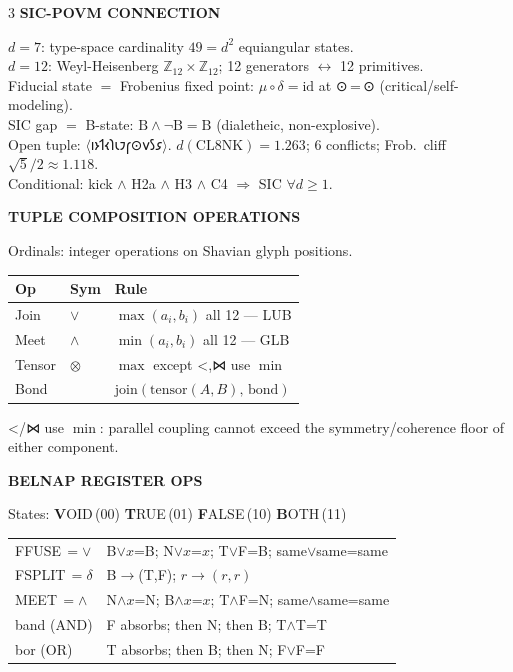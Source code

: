 \documentclass[7pt]{article}
\newcommand{\shead}[1]{%
  \vspace{2pt}%
  {\fontsize{6pt}{6.5pt}\selectfont\sffamily\bfseries\textcolor{hd}{\MakeUppercase{#1}}}%
  \vspace{0.3pt}\newline{\color{rl}\hrule height 0.2pt}\vspace{1pt}%
}
\newcommand{\sh}[1]{{\Large\shavfont #1}}
\newcommand{\prim}[1]{{\Large\igprimfont #1}}
\begin{document}
\begin{multicols}{3}
\vspace{1pt}
\shead{SIC-POVM Connection}
{\fontsize{6.5pt}{7.8pt}\selectfont
$d\!=\!7$: type-space cardinality $49 = d^2$ equiangular states.\\
$d\!=\!12$: Weyl-Heisenberg $\mathbb{Z}_{12}{\times}\mathbb{Z}_{12}$; 12 generators $\leftrightarrow$ 12 primitives.\\
Fiducial state $=$ Frobenius fixed point: $\mu\!\circ\!\delta\!=\!\mathrm{id}$ at \prim{⊙}\,=\,⊙ (critical/self-modeling).\\
SIC gap $=$ B-state: $\mathrm{B}\wedge\neg\mathrm{B}=\mathrm{B}$ (dialetheic, non-explosive).\\
Open tuple: $\langle$\sh{𐑦𐑶𐑑𐑬𐑐𐑧𐑲𐑝⊙𐑫𐑕𐑭}$\rangle$.
$d(\text{CL8NK})\!=\!1.263$; 6 conflicts; Frob.\ cliff $\sqrt{5}/2\!\approx\!1.118$.\\
Conditional: kick $\wedge$ H2a $\wedge$ H3 $\wedge$ C4 $\Rightarrow$ SIC $\forall d\!\geq\!1$.
}

\columnbreak

\shead{Tuple Composition Operations}
Ordinals: integer operations on Shavian glyph positions.

{\fontsize{6.5pt}{7.8pt}\selectfont
\begin{tabular}{@{}l@{\enspace}l@{\enspace}p{46mm}@{}}
\toprule
\textbf{Op} & \textbf{Sym} & \textbf{Rule} \\
\midrule
Join   & $\vee$    & $\max(a_i,b_i)$ all 12 — LUB \\
Meet   & $\wedge$  & $\min(a_i,b_i)$ all 12 — GLB \\
Tensor & $\otimes$ & $\max$ except \prim{<},\prim{⋈} use $\min$ \\
Bond   &           & $\mathrm{join}(\mathrm{tensor}(A,B),\,\mathrm{bond})$ \\
\bottomrule
\end{tabular}

\prim{<}/\prim{⋈} use $\min$: parallel coupling cannot exceed the symmetry/coherence floor of either component.
}

\vspace{1pt}
\shead{Belnap Register Ops}
States: \textbf{V}OID\,(00)\; \textbf{T}RUE\,(01)\; \textbf{F}ALSE\,(10)\; \textbf{B}OTH\,(11)

{\fontsize{6.5pt}{7.8pt}\selectfont
\begin{tabular}{@{}l@{\enspace}p{56mm}@{}}
FFUSE\,$=\vee$  & B$\vee x$=B;\; N$\vee x$=$x$;\; T$\vee$F=B;\; same$\vee$same=same \\
FSPLIT\,$=\delta$ & B$\to$(T,F);\; $r\to(r,r)$ \\
MEET\,$=\wedge$ & N$\wedge x$=N;\; B$\wedge x$=$x$;\; T$\wedge$F=N;\; same$\wedge$same=same \\
band (AND) & F absorbs; then N; then B; T$\wedge$T=T \\
bor (OR)   & T absorbs; then B; then N; F$\vee$F=F \\
\end{tabular}

}
\end{multicols}
\end{document}
